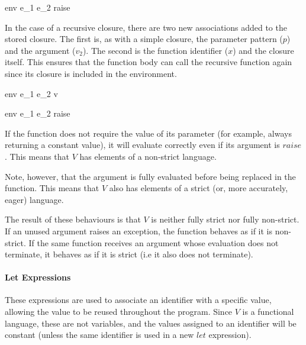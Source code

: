 \documentclass{article}
\begin{document}
    {\mbox{env} \vdash e_1 \; e_2 \Downarrow raise}

In the case of a recursive closure, there are two new associations added to the stored closure.
The first is, as with a simple closure, the parameter pattern ($p$) and the argument ($v_2$).
The second is the function identifier ($x$) and the closure itself.
This ensures that the function body can call the recursive function again since its closure is included in the environment.

    {\mbox{env} \vdash e_1 \; e_2 \Downarrow v}

    {\mbox{env} \vdash e_1 \; e_2 \Downarrow raise}

If the function does not require the value of its parameter (for example, always returning a constant value), it will evaluate correctly even if its argument is $raise$.
This means that $V$ has elements of a non-strict language.

Note, however, that the argument is fully evaluated before being replaced in the function.
This means that $V$ also has elements of a strict (or, more accurately, eager) language.

The result of these behaviours is that $V$ is neither fully strict nor fully non-strict.
If an unused argument raises an exception, the function behaves as if it is non-strict.
If the same function receives an argument whose evaluation does not terminate, it behaves as if it is strict (i.e it also does not terminate).

\paragraph{Let Expressions}
These expressions are used to associate an identifier with a specific value, allowing the value to be reused throughout the program.
Since $V$ is a functional language, these are not variables, and the values assigned to an identifier will be constant (unless the same identifier is used in a new $let$ expression).
\end{document}
